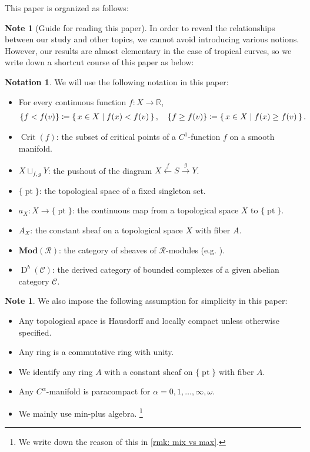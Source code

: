\documentclass[a4paper,dvipdfmx,reqno,12pt]{amsart}
\theoremstyle{definition}
\newtheorem{Note}[theorem]{Note}
\newtheorem{Not}[theorem]{Notation}
\newcommand{\deq}{\coloneqq}
\newcommand{\opn}[1]{\operatorname{#1}}
\newcommand{\catn}[1]{\mathbf{#1}}
\newcommand{\xto}[1]{\xrightarrow{#1}}
\newcommand{\xgets}[1]{\xleftarrow{#1}}
\newcommand{\myfootnote}[1]{\hspace{-5pt}\footnote{#1}}
\numberwithin{equation}{section}
\begin{document}
This paper is organized as follows:

\begin{Note}[Guide for reading this paper]
  In order to reveal the relationships between our study
  and other topics, we cannot avoid introducing various
  notions. However, our results are almost elementary
in the case of tropical curves,
  so we write down a shortcut course of this paper as below:
\end{Note}

\begin{Not}

We will use the following notation in this paper:

\begin{itemize}
\item For every continuous function $f\colon X\to {\mathbb{R}}$,
\begin{align*}
\{f<f(v)\}\deq \set{x\in X\mid f(x)< f(v)},\quad
\{f\geq f(v)\}\deq \set{x\in X\mid f(x)\geq f(v)}.
\end{align*}
\item $\opn{Crit}(f)$: the subset of critical points of
a $C^{1}$-function $f$ on a smooth manifold.
\item   $X\sqcup_{f,g}Y$: the pushout of the diagram
  $X\xgets{f} S\xto{g} Y$.
\item $\{\opn{pt}\}$: the topological space of 
a fixed singleton set.
\item $a_X\colon X\to \{\opn{pt}\}$:
the continuous map from a topological space $X$ to
$\{\opn{pt}\}$.
\item $A_X$: the constant sheaf on a topological space $X$ 
with fiber $A$.
\item $\catn{Mod}(\mathcal{R})$: the category of 
sheaves of $\mathcal{R}$-modules
(e.g. \cite[Definition 2.2.6]{MR1299726}).
\item $\opn{D}^{b}(\mathcal{C})$: the derived category
of bounded complexes of a given abelian category 
$\mathcal{C}$.
\end{itemize}

\end{Not}

\begin{Note}
We also impose the following assumption for simplicity in this paper:
\begin{itemize}
\item Any topological space is Hausdorff and
locally compact unless otherwise specified.
\item Any ring is a commutative ring with unity.
\item We identify any ring $A$ with a constant sheaf on
$\{\opn{pt}\}$ with fiber $A$.
\item Any $C^{\alpha}$-manifold is paracompact for 
$\alpha=0,1,\ldots,\infty,\omega$.
\item We mainly use min-plus algebra.
\myfootnote{We write down the reason of this in 
\cref{rmk: mix vs max}.}
\end{itemize}



\end{Note}
\end{document}
